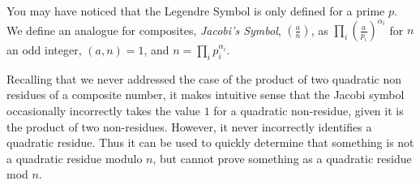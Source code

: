 \documentclass{article}
\newtheorem*{theorem}{Theorem}
\newtheorem*{definition}{Definition}
\begin{document}
\par You may have noticed that the Legendre Symbol is only defined for a prime $p$. We define an analogue for composites, \textit{Jacobi's Symbol}, $\left( \frac{a}{n} \right)$, as $\prod_i \left( \frac{a}{p_i} \right) ^{\alpha_i}$ for $n$ an odd integer, $(a,n) = 1$, and $n = \prod_i p_i^{\alpha_i}$. 

\par Recalling that we never addressed the case of the product of two quadratic non residues of a composite number, it makes intuitive sense that the Jacobi symbol occasionally incorrectly takes the value $1$ for a quadratic non-residue, given it is the product of two non-residues. However, it never incorrectly identifies a quadratic residue.  Thus it can be used to quickly determine that something is not a quadratic residue modulo $n$, but cannot prove something as a quadratic residue mod $n$.



\end{document}
